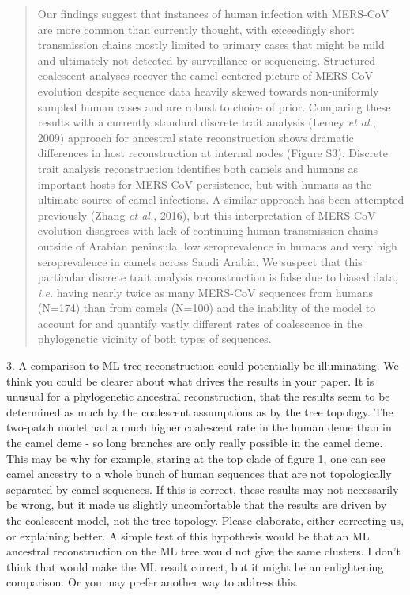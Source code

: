 \documentclass[11pt,oneside,letterpaper]{article}
\begin{document}
\begin{quotation}
Our findings suggest that instances of human infection with MERS-CoV are more common than currently thought, with exceedingly short transmission chains mostly limited to primary cases that might be mild and ultimately not detected by surveillance or sequencing.
Structured coalescent analyses recover the camel-centered picture of MERS-CoV evolution despite sequence data heavily skewed towards non-uniformly sampled human cases and are robust to choice of prior.
Comparing these results with a currently standard discrete trait analysis (Lemey \textit{et al.}, 2009) approach for ancestral state reconstruction shows dramatic differences in host reconstruction at internal nodes (Figure S3).
Discrete trait analysis reconstruction identifies both camels and humans as important hosts for MERS-CoV persistence, but with humans as the ultimate source of camel infections.
A similar approach has been attempted previously (Zhang \textit{et al.}, 2016), but this interpretation of MERS-CoV evolution disagrees with lack of continuing human transmission chains outside of Arabian peninsula, low seroprevalence in humans and very high seroprevalence in camels across Saudi Arabia.
We suspect that this particular discrete trait analysis reconstruction is false due to biased data, \textit{i.e.} having nearly twice as many MERS-CoV sequences from humans (N=174) than from camels (N=100) and the inability of the model to account for and quantify vastly different rates of coalescence in the phylogenetic vicinity of both types of sequences.
\end{quotation}

3. A comparison to ML tree reconstruction could potentially be illuminating. We think you could be clearer about what drives the results in your paper. It is unusual for a phylogenetic ancestral reconstruction, that the results seem to be determined as much by the coalescent assumptions as by the tree topology. The two-patch model had a much higher coalescent rate in the human deme than in the camel deme - so long branches are only really possible in the camel deme. This may be why for example, staring at the top clade of figure 1, one can see camel ancestry to a whole bunch of human sequences that are not topologically separated by camel sequences. If this is correct, these results may not necessarily be wrong, but it made us slightly uncomfortable that the results are driven by the coalescent model, not the tree topology. Please elaborate, either correcting us, or explaining better. A simple test of this hypothesis would be that an ML ancestral reconstruction on the ML tree would not give the same clusters. I don't think that would make the ML result correct, but it might be an enlightening comparison. Or you may prefer another way to address this.
\end{document}
